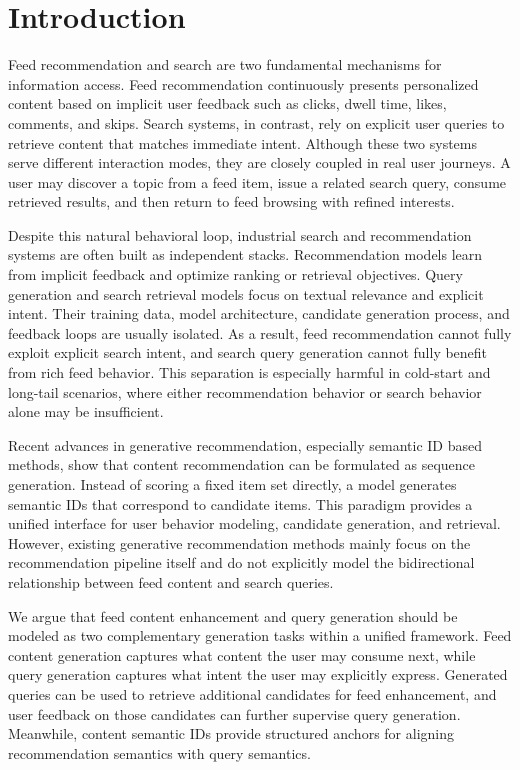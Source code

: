 \documentclass[11pt]{article}
\begin{document}
\section{Introduction}

Feed recommendation and search are two fundamental mechanisms for information access. Feed recommendation continuously presents personalized content based on implicit user feedback such as clicks, dwell time, likes, comments, and skips. Search systems, in contrast, rely on explicit user queries to retrieve content that matches immediate intent. Although these two systems serve different interaction modes, they are closely coupled in real user journeys. A user may discover a topic from a feed item, issue a related search query, consume retrieved results, and then return to feed browsing with refined interests.

Despite this natural behavioral loop, industrial search and recommendation systems are often built as independent stacks. Recommendation models learn from implicit feedback and optimize ranking or retrieval objectives. Query generation and search retrieval models focus on textual relevance and explicit intent. Their training data, model architecture, candidate generation process, and feedback loops are usually isolated. As a result, feed recommendation cannot fully exploit explicit search intent, and search query generation cannot fully benefit from rich feed behavior. This separation is especially harmful in cold-start and long-tail scenarios, where either recommendation behavior or search behavior alone may be insufficient.

Recent advances in generative recommendation, especially semantic ID based methods, show that content recommendation can be formulated as sequence generation. Instead of scoring a fixed item set directly, a model generates semantic IDs that correspond to candidate items. This paradigm provides a unified interface for user behavior modeling, candidate generation, and retrieval. However, existing generative recommendation methods mainly focus on the recommendation pipeline itself and do not explicitly model the bidirectional relationship between feed content and search queries.

We argue that feed content enhancement and query generation should be modeled as two complementary generation tasks within a unified framework. Feed content generation captures what content the user may consume next, while query generation captures what intent the user may explicitly express. Generated queries can be used to retrieve additional candidates for feed enhancement, and user feedback on those candidates can further supervise query generation. Meanwhile, content semantic IDs provide structured anchors for aligning recommendation semantics with query semantics.
\end{document}
